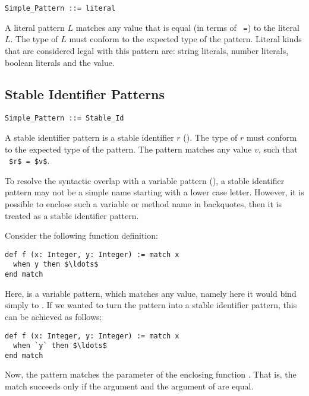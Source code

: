 \syntax\begin{lstlisting}
Simple_Pattern ::= literal
\end{lstlisting}

A literal pattern $L$ matches any value that is equal (in terms of ~\lstinline!=!) to the literal $L$. The type of $L$ must conform to the expected type of the pattern. Literal kinds that are considered legal with this pattern are: string literals, number literals, boolean literals and the  value. 





\subsection{Stable Identifier Patterns}
\label{sec:stable-identifier-patterns}

\syntax\begin{lstlisting}
Simple_Pattern ::= Stable_Id
\end{lstlisting}

A stable identifier pattern is a stable identifier $r$ (). The type of $r$ must conform to the expected type of the pattern. The pattern matches any value $v$, such that ~\lstinline!$r$ = $v$!.

To resolve the syntactic overlap with a variable pattern (), a stable identifier pattern may not be a simple name starting with a lower case letter. However, it is possible to enclose such a variable or method name in backquotes, then it is treated as a stable identifier pattern. 

\example Consider the following function definition:
\begin{lstlisting}
def f (x: Integer, y: Integer) := match x
  when y then $\ldots$
end match
\end{lstlisting}
Here,  is a variable pattern, which matches any value, namely here it would bind simply to . If we wanted to turn the pattern into a stable identifier pattern, this can be achieved as follows:
\begin{lstlisting}
def f (x: Integer, y: Integer) := match x
  when `y` then $\ldots$
end match
\end{lstlisting}
Now, the pattern matches the  parameter of the enclosing function . That is, the match succeeds only if the  argument and the  argument of  are equal. 







